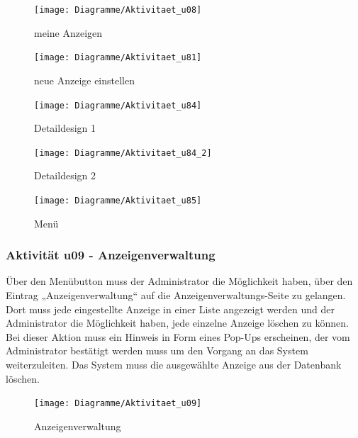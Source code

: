 \documentclass[a4paper,12pt,oneside]{scrartcl}
\begin{document}
\begin{figure}[!htbp]
\centering
\noindent\texttt{[image: Diagramme/Aktivitaet\_u08]}
\caption{meine Anzeigen}
\end{figure}
\FloatBarrier

\begin{figure}[!htbp]
\centering
\noindent\texttt{[image: Diagramme/Aktivitaet\_u81]}
\caption{neue Anzeige einstellen}
\end{figure}
\FloatBarrier

\begin{figure}[!htbp]
\centering
\noindent\texttt{[image: Diagramme/Aktivitaet\_u84]}
\caption{Detaildesign 1}
\end{figure}
\FloatBarrier

\begin{figure}[!htbp]
\centering
\noindent\texttt{[image: Diagramme/Aktivitaet\_u84\_2]}
\caption{Detaildesign 2}
\end{figure}
\FloatBarrier

\begin{figure}[!htbp]
\centering
\noindent\texttt{[image: Diagramme/Aktivitaet\_u85]}
\caption{Menü}
\end{figure}
\FloatBarrier

\subsubsection{Aktivität u09 - Anzeigenverwaltung}
Über den Menübutton muss der Administrator die Möglichkeit haben, über den Eintrag „Anzeigenverwaltung“ auf die Anzeigenverwaltungs-Seite zu gelangen.
Dort muss jede eingestellte Anzeige in einer Liste angezeigt werden und der Administrator die Möglichkeit haben, jede einzelne Anzeige löschen zu können.
Bei dieser Aktion muss ein Hinweis in Form eines Pop-Ups erscheinen, der vom Administrator bestätigt werden muss um den Vorgang an das System weiterzuleiten.
Das System muss die ausgewählte Anzeige aus der Datenbank löschen.

\begin{figure}[!htbp]
\centering
\noindent\texttt{[image: Diagramme/Aktivitaet\_u09]}
\caption{Anzeigenverwaltung}
\end{figure}
\FloatBarrier


\newpage
\end{document}
